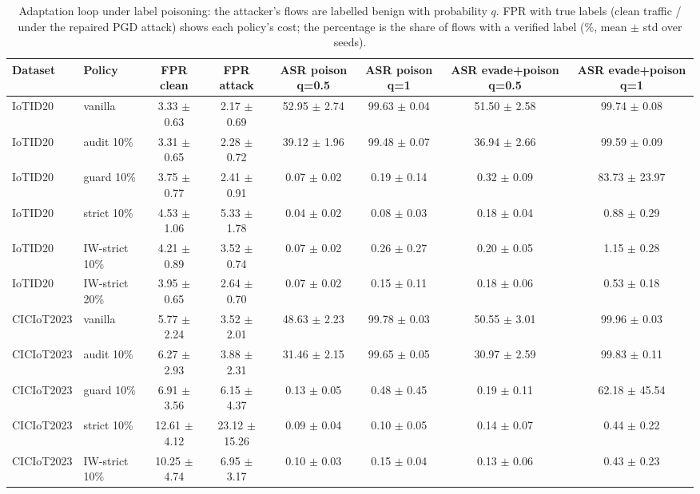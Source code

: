 \begin{table}[t]
\centering
\caption{Adaptation loop under label poisoning: the attacker's flows are labelled benign with probability $q$. FPR with true labels (clean traffic / under the repaired PGD attack) shows each policy's cost; the percentage is the share of flows with a verified label (\%, mean $\pm$ std over seeds).}
\label{tab:loop}
\footnotesize
\setlength{\tabcolsep}{3pt}
\begin{tabular}{llcccccc}
\toprule
Dataset & Policy & FPR clean & FPR attack & ASR poison q=0.5 & ASR poison q=1 & ASR evade+poison q=0.5 & ASR evade+poison q=1 \\
\midrule
IoTID20 & vanilla & 3.33 $\pm$ 0.63 & 2.17 $\pm$ 0.69 & 52.95 $\pm$ 2.74 & 99.63 $\pm$ 0.04 & 51.50 $\pm$ 2.58 & 99.74 $\pm$ 0.08 \\
IoTID20 & audit 10\% & 3.31 $\pm$ 0.65 & 2.28 $\pm$ 0.72 & 39.12 $\pm$ 1.96 & 99.48 $\pm$ 0.07 & 36.94 $\pm$ 2.66 & 99.59 $\pm$ 0.09 \\
IoTID20 & guard 10\% & 3.75 $\pm$ 0.77 & 2.41 $\pm$ 0.91 & 0.07 $\pm$ 0.02 & 0.19 $\pm$ 0.14 & 0.32 $\pm$ 0.09 & 83.73 $\pm$ 23.97 \\
IoTID20 & strict 10\% & 4.53 $\pm$ 1.06 & 5.33 $\pm$ 1.78 & 0.04 $\pm$ 0.02 & 0.08 $\pm$ 0.03 & 0.18 $\pm$ 0.04 & 0.88 $\pm$ 0.29 \\
IoTID20 & IW-strict 10\% & 4.21 $\pm$ 0.89 & 3.52 $\pm$ 0.74 & 0.07 $\pm$ 0.02 & 0.26 $\pm$ 0.27 & 0.20 $\pm$ 0.05 & 1.15 $\pm$ 0.28 \\
IoTID20 & IW-strict 20\% & 3.95 $\pm$ 0.65 & 2.64 $\pm$ 0.70 & 0.07 $\pm$ 0.02 & 0.15 $\pm$ 0.11 & 0.18 $\pm$ 0.06 & 0.53 $\pm$ 0.18 \\
CICIoT2023 & vanilla & 5.77 $\pm$ 2.24 & 3.52 $\pm$ 2.01 & 48.63 $\pm$ 2.23 & 99.78 $\pm$ 0.03 & 50.55 $\pm$ 3.01 & 99.96 $\pm$ 0.03 \\
CICIoT2023 & audit 10\% & 6.27 $\pm$ 2.93 & 3.88 $\pm$ 2.31 & 31.46 $\pm$ 2.15 & 99.65 $\pm$ 0.05 & 30.97 $\pm$ 2.59 & 99.83 $\pm$ 0.11 \\
CICIoT2023 & guard 10\% & 6.91 $\pm$ 3.56 & 6.15 $\pm$ 4.37 & 0.13 $\pm$ 0.05 & 0.48 $\pm$ 0.45 & 0.19 $\pm$ 0.11 & 62.18 $\pm$ 45.54 \\
CICIoT2023 & strict 10\% & 12.61 $\pm$ 4.12 & 23.12 $\pm$ 15.26 & 0.09 $\pm$ 0.04 & 0.10 $\pm$ 0.05 & 0.14 $\pm$ 0.07 & 0.44 $\pm$ 0.22 \\
CICIoT2023 & IW-strict 10\% & 10.25 $\pm$ 4.74 & 6.95 $\pm$ 3.17 & 0.10 $\pm$ 0.03 & 0.15 $\pm$ 0.04 & 0.13 $\pm$ 0.06 & 0.43 $\pm$ 0.23 \\

\end{tabular}
\end{table}
